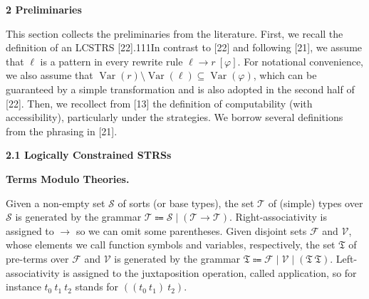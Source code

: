 
 
\par\medskip\noindent\textbf{2 Preliminaries}\par
 
 
This section collects the preliminaries from the literature. First, we recall the definition of an LCSTRS [22].111In contrast to [22] and following [21], we assume that $\ell$ is a pattern in every rewrite rule ${\ell}\rightarrow{r}\ [\varphi]$. For notational convenience, we also assume that $\operatorname{Var}(r)\setminus\operatorname{Var}(\ell)\subseteq\operatorname{Var}(\varphi)$, which can be guaranteed by a simple transformation and is also adopted in the second half of [22]. Then, we recollect from [13] the definition of computability (with accessibility), particularly under the strategies. We borrow several definitions from the phrasing in [21].\par
 
 
 
\par\medskip\noindent\textbf{2.1 Logically Constrained STRSs}\par
 
 
\par\medskip\noindent\textbf{Terms Modulo Theories.}\par
 
 
Given a non-empty set $\mathcal{S}$ of sorts (or base types), the set $\mathcal{T}$ of (simple) types over $\mathcal{S}$ is generated by the grammar $\mathcal{T}\Coloneqq\mathcal{S}\mid(\mathcal{T}\rightarrow\mathcal{T})$. Right-associativity is assigned to $\rightarrow$ so we can omit some parentheses. Given disjoint sets $\mathcal{F}$ and $\mathcal{V}$, whose elements we call function symbols and variables, respectively, the set $\mathfrak{T}$ of pre-terms over $\mathcal{F}$ and $\mathcal{V}$ is generated by the grammar $\mathfrak{T}\Coloneqq\mathcal{F}\mid\mathcal{V}\mid({\mathfrak{T}}\ {\mathfrak{T}})$. Left-associativity is assigned to the juxtaposition operation, called application, so for instance ${{t_{0}}\ {t_{1}}}\ {t_{2}}$ stands for $({({t_{0}}\ {t_{1}})}\ {t_{2}})$.\par
 
 
 
